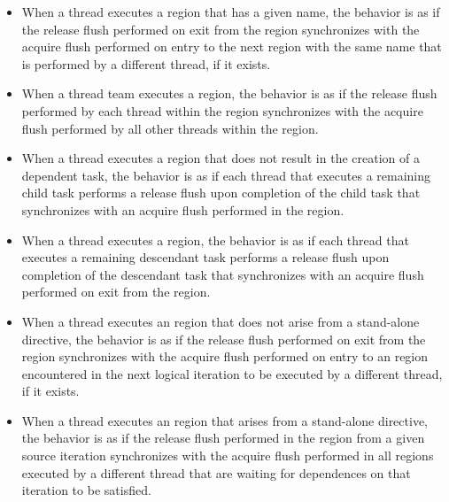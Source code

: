 \begin{itemize}
    \item When a thread executes a  region that has a given
        name, the behavior is as if the release flush performed on exit from
        the region synchronizes with the acquire flush performed on entry to
        the next  region with the same name that is performed
        by a different thread, if it exists.

    \item When a thread team executes a  region, the
	behavior is as if the release flush performed by each thread within
        the region synchronizes with the acquire flush performed by all other
        threads within the region.

    \item When a thread executes a  region that does not result
        in the creation of a dependent task, the behavior is as if each thread
        that executes a remaining child task performs a release flush upon
        completion of the child task that synchronizes with an acquire flush
        performed in the  region.

    \item When a thread executes a  region, the behavior is as
        if each thread that executes a remaining descendant task performs a
        release flush upon completion of the descendant task that synchronizes
        with an acquire flush performed on exit from the 
        region.

    \item When a thread executes an  region that does not arise from
        a stand-alone  directive, the behavior is as if the
        release flush performed on exit from the region
        synchronizes with the acquire flush performed on entry to an
         region encountered in the next logical iteration to be
        executed by a different thread, if it exists.

    \item When a thread executes an  region that arises from a
        stand-alone  directive, the behavior is as if the
        release flush performed in the  region from a given
        source iteration synchronizes with the acquire flush performed in all
         regions executed by a different thread that are waiting
        for dependences on that iteration to be satisfied.


\end{itemize}
